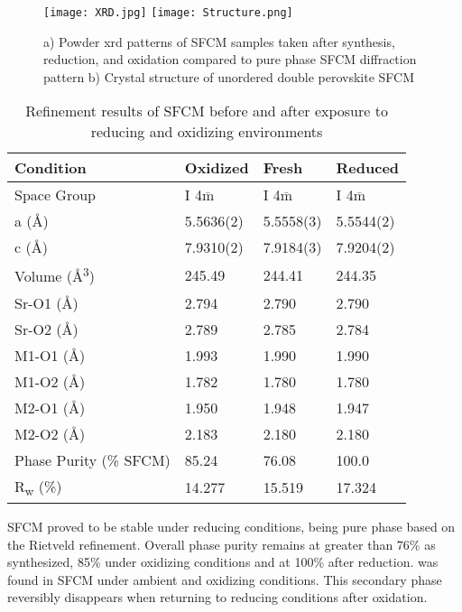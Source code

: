     \begin{figure}[p]
      \texttt{[image: XRD.jpg]}
      \texttt{[image: Structure.png]}
      \caption{a) Powder \gls{xrd} patterns of SFCM samples taken after synthesis, reduction, and oxidation compared to pure phase SFCM diffraction pattern b) Crystal structure of unordered double perovskite SFCM}
      \label{fig:structure}
    \end{figure}

    \begin{table}
        \centering
        \caption{Refinement results of SFCM before and after exposure to reducing and oxidizing environments}
        \label{tab:xrdrefine}
        \begin{tabular}{llll}
        Condition & Oxidized & Fresh   & Reduced  \\
        \hline
        Space Group                & I 4$\overline{\text{m}}$    & I 4$\overline{\text{m}}$   & I 4$\overline{\text{m}}$    \\
        a (\si{\angstrom})        & 5.5636(2)   & 5.5558(3)  & 5.5544(2)   \\
        c (\si{\angstrom})        & 7.9310(2)   & 7.9184(3)  & 7.9204(2)   \\
        Volume (\si{\angstrom\cubed}) & 245.49  & 244.41 & 244.35  \\
        Sr-O1 (\si{\angstrom})    & 2.794  & 2.790 & 2.790   \\
        Sr-O2 (\si{\angstrom})    & 2.789  & 2.785 & 2.784   \\
        M1-O1 (\si{\angstrom})    & 1.993  & 1.990 & 1.990   \\
        M1-O2 (\si{\angstrom})    & 1.782  & 1.780 & 1.780   \\
        M2-O1 (\si{\angstrom})    & 1.950  & 1.948 & 1.947   \\
        M2-O2 (\si{\angstrom})    & 2.183  & 2.180 & 2.180   \\
        Phase Purity (\% SFCM)    & 85.24  & 76.08 & 100.0   \\
        R\textsubscript{w} (\%)   & 14.277 & 15.519 & 17.324
        \end{tabular}
        \end{table}

    SFCM proved to be stable under reducing conditions, being pure phase based on the Rietveld refinement.
    Overall phase purity remains at greater than 76\% as synthesized, 85\% under oxidizing conditions and at 100\% after reduction.
     was found in SFCM under ambient and oxidizing conditions.
    This secondary phase reversibly disappears when returning to reducing conditions after oxidation.

